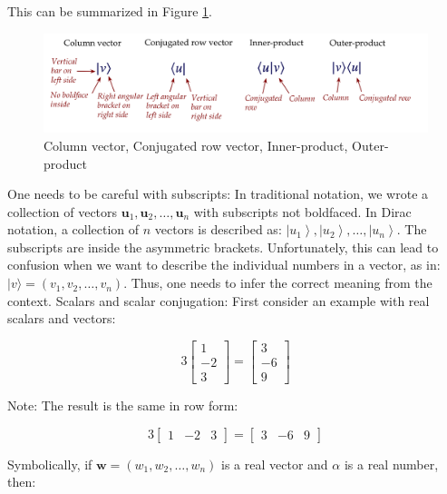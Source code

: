 \documentclass[main.tex]{subfiles}
\begin{document}
    This can be summarized in Figure \ref{fig:07dirac}.
    
    \begin{figure}
        \centering
        \includegraphics[width=5in]{notes/figs/n04/07dirac.png}
        \caption{Column vector, Conjugated row vector, Inner-product, Outer-product}
        \label{fig:07dirac}
    \end{figure}
    
    One needs to be careful with subscripts: In traditional notation, we wrote a collection of vectors $\mathbf{u}_{1}, \mathbf{u}_{2}, \ldots, \mathbf{u}_{n}$ with subscripts not boldfaced. In Dirac notation, a collection of $n$ vectors is described as: $\left|u_{1}\right\rangle,\left|u_{2}\right\rangle, \ldots,\left|u_{n}\right\rangle$. The subscripts are inside the asymmetric brackets. Unfortunately, this can lead to confusion when we want to describe the individual numbers in a vector, as in: $|v\rangle=\left(v_{1}, v_{2}, \ldots, v_{n}\right)$. Thus, one needs to infer the correct meaning from the context. Scalars and scalar conjugation: First consider an example with real scalars and vectors:
    
    $$
    3\left[\begin{array}{r}
    1 \\
    -2 \\
    3
    \end{array}\right]=\left[\begin{array}{r}
    3 \\
    -6 \\
    9
    \end{array}\right]
    $$
    
    Note: The result is the same in row form:
    
    $$
    3\left[\begin{array}{lll}
    1 & -2 & 3
    \end{array}\right]=\left[\begin{array}{lll}
    3 & -6 & 9
    \end{array}\right]
    $$
    
    Symbolically, if $\mathbf{w}=\left(w_{1}, w_{2}, \ldots, w_{n}\right)$ is a real vector and $\alpha$ is a real number, then:
    
\end{document}
